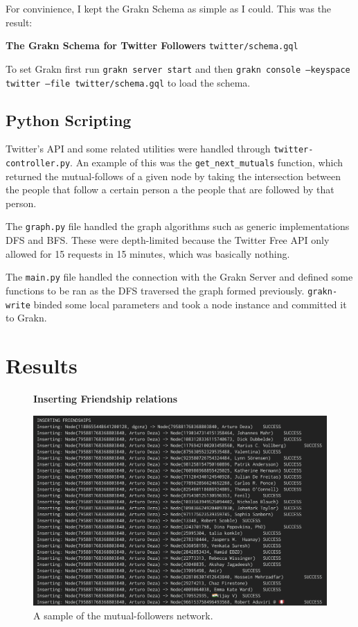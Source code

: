 \documentclass[a4 paper,12pt]{article}
\begin{document}
For convinience, I kept the Grakn Schema as simple as I could. This was the result:

\FloatBarrier
\textbf{The Grakn Schema for Twitter Followers} \texttt{twitter/schema.gql}\par\medskip
    
\FloatBarrier

To set Grakn first run \texttt{grakn server start} and then \texttt{grakn console --keyspace twitter --file twitter/schema.gql} to load the schema.

\subsection{Python Scripting}

Twitter's API and some related utilities were handled through \texttt{twitter-controller.py}. An example of this was the \texttt{get\_next\_mutuals} function, which returned the mutual-follows of a given node by taking the intersection between the people that follow a certain person a the people that are followed by that person.


The \texttt{graph.py} file handled the graph algorithms such as generic implementations DFS and BFS. These were depth-limited because the Twitter Free API only allowed for 15 requests in 15 minutes, which was basically nothing.

The \texttt{main.py} file handled the connection with the Grakn Server and defined some functions to be ran as the DFS traversed the graph formed previously. \texttt{grakn-write} binded some local parameters and took a node instance and committed it to Grakn.



\section{Results}

\FloatBarrier
\begin{figure}
\centering
\textbf{Inserting Friendship relations}\par\medskip
    \includegraphics[scale=0.30]{figures/success.png}
\caption {A sample of the mutual-followers network.}
\end{figure}
\FloatBarrier
\end{document}
